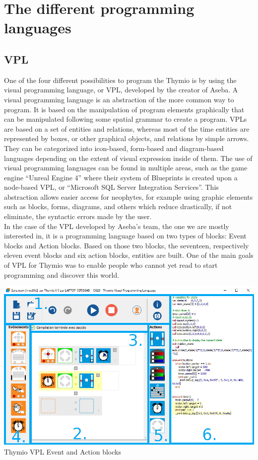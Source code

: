 \documentclass{scrreprt}
\begin{document}
\appendix

\chapter{The different programming languages \label{fourlanguages}} 
\section{VPL}

One of the four different possibilities to program the Thymio is by using the visual programming language, or VPL, 
developed by the creator of Aseba. A visual programming language is an abstraction of the more common way to program. 
It is based on the manipulation of program elements graphically that can be manipulated following some spatial grammar to create a program. 
VPLs are based on a set of entities and relations, whereas most of the time entities are represented by boxes, 
or other graphical objects, and relations by simple arrows. They can be categorized into icon-based, 
form-based and diagram-based languages depending on the extent of visual expression inside of them. 
The use of visual programming languages can be found in multiple areas, such as the game engine “Unreal Engine 4” where their system of Blueprints is created upon a node-based VPL, 
or “Microsoft SQL Server Integration Services”. This abstraction allows easier access for neophytes, 
for example using graphic elements such as blocks, forms, diagrams, and others which reduce drastically, if not eliminate, the syntactic errors made by the user.\\

In the case of the VPL developed by Aseba’s team, the one we are mostly interested in, it is a programming language based on two types of blocks: Event blocks and Action blocks. 
Based on those two blocks, the seventeen, respectively eleven event blocks and six action blocks, entities are built. 
One of the main goals of VPL for Thymio was to enable people who cannot yet read to start programming and discover this world.\\

\begin{center}
  \includegraphics[width=\textwidth]{./VPL/Thymio_VPL_window}\\
  Thymio VPL Event and Action blocks
\end{center}
\end{document}
